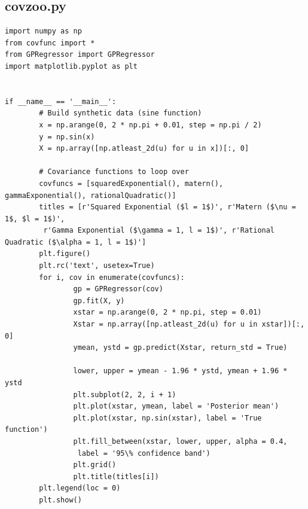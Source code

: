\documentclass[10pt,a4paper,twoside]{book}
\begin{document}
   \subsection*{covzoo.py}
   \label{covzoo}
   \begin{verbatim}
import numpy as np
from covfunc import *
from GPRegressor import GPRegressor
import matplotlib.pyplot as plt


if __name__ == '__main__':
        # Build synthetic data (sine function)
        x = np.arange(0, 2 * np.pi + 0.01, step = np.pi / 2)
        y = np.sin(x)
        X = np.array([np.atleast_2d(u) for u in x])[:, 0]

        # Covariance functions to loop over
        covfuncs = [squaredExponential(), matern(), gammaExponential(), rationalQuadratic()]
        titles = [r'Squared Exponential ($l = 1$)', r'Matern ($\nu = 1$, $l = 1$)',
         r'Gamma Exponential ($\gamma = 1, l = 1$)', r'Rational Quadratic ($\alpha = 1, l = 1$)']
        plt.figure()
        plt.rc('text', usetex=True)
        for i, cov in enumerate(covfuncs):
                gp = GPRegressor(cov)
                gp.fit(X, y)
                xstar = np.arange(0, 2 * np.pi, step = 0.01)
                Xstar = np.array([np.atleast_2d(u) for u in xstar])[:, 0]
                ymean, ystd = gp.predict(Xstar, return_std = True)
                
                lower, upper = ymean - 1.96 * ystd, ymean + 1.96 * ystd
                plt.subplot(2, 2, i + 1)
                plt.plot(xstar, ymean, label = 'Posterior mean')
                plt.plot(xstar, np.sin(xstar), label = 'True function')
                plt.fill_between(xstar, lower, upper, alpha = 0.4,
                 label = '95\% confidence band')
                plt.grid()
                plt.title(titles[i])
        plt.legend(loc = 0)
        plt.show()
\end{verbatim}
\end{document}
